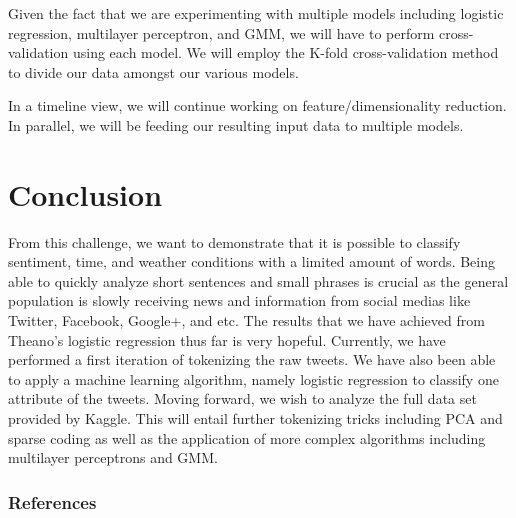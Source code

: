 \documentclass{article}
\begin{document}
Given the fact that we are experimenting with multiple models including logistic regression, multilayer perceptron, and GMM, we will have to perform cross-validation using each model. We will employ the K-fold cross-validation method to divide our data amongst our various models.

In a timeline view, we will continue working on feature/dimensionality reduction. In parallel, we will be feeding our resulting input data to multiple models.

\section{Conclusion}
From this challenge, we want to demonstrate that it is possible to classify sentiment, time, and weather conditions with a limited amount of words. Being able to quickly analyze short sentences and small phrases is crucial as the general population is slowly receiving news and information from social medias like Twitter, Facebook, Google+, and etc. The results that we have achieved from Theano's logistic regression thus far is very hopeful. Currently, we have performed a first iteration of tokenizing the raw tweets. We have also been able to apply a machine learning algorithm, namely logistic regression to classify one attribute of the tweets. Moving forward, we wish to analyze the full data set provided by Kaggle. This will entail further tokenizing tricks including PCA and sparse coding as well as the application of more complex algorithms including multilayer perceptrons and GMM.

\subsubsection*{References}
\end{document}
